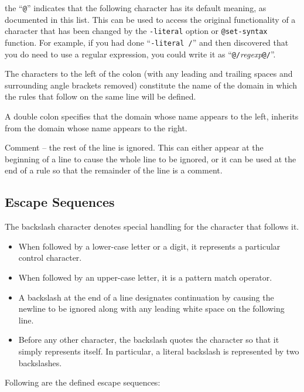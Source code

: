 \begin{description}
the ``\verb/@/'' indicates that the following character has its default
meaning, as documented in this list.
This can be used to access the original functionality of a
character that has been changed by the
\verb/-literal/ option or \verb/@set-syntax/ function.
For example, if you had done ``\verb|-literal /|'' and then discovered that
you do need to use a regular expression, you could write it as
``\verb|@/|{\it regexp}\verb|@/|''.
\item[{\tt :}] 
The characters to the left of the colon (with any leading and trailing
spaces and surrounding angle brackets removed) constitute the name of
the domain in which the rules that follow on the same line will be defined.
\item[{\tt ::}]
A double colon specifies that the domain whose name appears to the left,
inherits from the domain whose name appears to the right.
\item[{\tt !}]
Comment -- the rest of the line is ignored.  This can either appear at
the beginning of a line to cause the whole line to be ignored, or it can
be used at the end of a rule so that the remainder of the line is a comment.
\end{description}


\subsection{Escape Sequences}
The backslash character denotes special handling for the character that
follows it.
\begin{itemize}
\item When followed by a lower-case letter or a digit, it
represents a particular control character.
\item When followed by an upper-case letter, it is a pattern match operator.
\item A backslash at the end of
a line designates continuation by causing the newline to be ignored
along with any leading white space on the following line.
\item Before any other character, the backslash quotes the character so that
it simply represents itself.  In particular, a literal backslash is
represented by two backslashes.
\end{itemize}

Following are the defined escape sequences:

